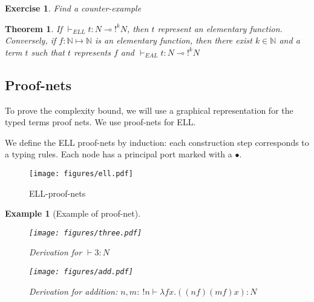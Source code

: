 \documentclass[a4paper,10pt]{article}
\newcommand{\limpl}{\multimap}  %
\newcommand{\Nset}{\mathbb{N}} %
\newtheorem{thm}{Theorem}
\newtheorem{ex}{Example}
\newtheorem{exo}{Exercise}
\begin{document}
\begin{exo}
Find a counter-example
\end{exo}

\begin{thm}
If $\vdash_{ELL} t:N \limpl !^{k} N$, then $t$ represent an elementary function.\\
Conversely, if $f: \Nset \mapsto \Nset$ is an elementary function, then there exist $k\in \Nset$ and a term $t$ such that $t$ represents $f$ and $\vdash_{EAL} t:N\limpl !^{k}N$
\end{thm}


\subsection{Proof-nets}

 To prove the complexity bound, we will use a graphical representation for the typed terms proof nets. We use proof-nets for ELL.


 We define the ELL proof-nets by induction: each construction step corresponds to a typing rules. Each node has a principal port marked with a $\bullet$.

\begin{figure}[h]
	\begin{center}
		\texttt{[image: figures/ell.pdf]}
		\caption{ELL-proof-nets}
	\end{center}	
\end{figure}

\begin{ex}[Example of proof-net]

\begin{figure}[h]
   \begin{minipage}[c]{.46\linewidth}
      \texttt{[image: figures/three.pdf]}
      \caption{Derivation for $\vdash 3:N$}
   \end{minipage} \hfill
   \begin{minipage}[c]{.46\linewidth}
      \texttt{[image: figures/add.pdf]}
      \caption{Derivation for addition: $n,m:\ !n \vdash \lambda f x. ((n f) (m f) x): N$}
   \end{minipage}
\end{figure}

\end{ex}
\end{document}
